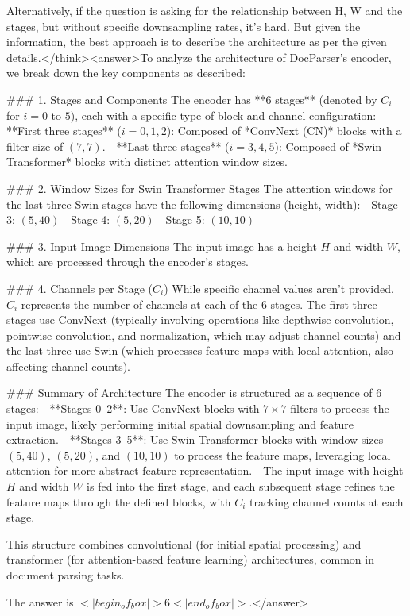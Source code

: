 Alternatively, if the question is asking for the relationship between H, W and the stages, but without specific downsampling rates, it's hard. But given the information, the best approach is to describe the architecture as per the given details.</think><answer>To analyze the architecture of DocParser's encoder, we break down the key components as described:  

### 1. Stages and Components  
The encoder has **6 stages** (denoted by \( C_i \) for \( i = 0 \) to \( 5 \)), each with a specific type of block and channel configuration:  
- **First three stages** (\( i = 0, 1, 2 \)): Composed of *ConvNext (CN)* blocks with a filter size of \( (7, 7) \).  
- **Last three stages** (\( i = 3, 4, 5 \)): Composed of *Swin Transformer* blocks with distinct attention window sizes.    

### 2. Window Sizes for Swin Transformer Stages  
The attention windows for the last three Swin stages have the following dimensions (height, width):  
- Stage 3: \( (5, 40) \)  
- Stage 4: \( (5, 20) \)  
- Stage 5: \( (10, 10) \)  

### 3. Input Image Dimensions  
The input image has a height \( H \) and width \( W \), which are processed through the encoder’s stages.  

### 4. Channels per Stage (\( C_i \))  
While specific channel values aren’t provided, \( C_i \) represents the number of channels at each of the 6 stages. The first three stages use ConvNext (typically involving operations like depthwise convolution, pointwise convolution, and normalization, which may adjust channel counts) and the last three use Swin (which processes feature maps with local attention, also affecting channel counts).    

### Summary of Architecture  
The encoder is structured as a sequence of 6 stages:  
- **Stages 0–2**: Use ConvNext blocks with \( 7 \times 7 \) filters to process the input image, likely performing initial spatial downsampling and feature extraction.  
- **Stages 3–5**: Use Swin Transformer blocks with window sizes \( (5, 40) \), \( (5, 20) \), and \( (10, 10) \) to process the feature maps, leveraging local attention for more abstract feature representation.  
- The input image with height \( H \) and width \( W \) is fed into the first stage, and each subsequent stage refines the feature maps through the defined blocks, with \( C_i \) tracking channel counts at each stage.  

This structure combines convolutional (for initial spatial processing) and transformer (for attention-based feature learning) architectures, common in document parsing tasks.  

The answer is \(<|begin_of_box|>6<|end_of_box|>\).</answer>